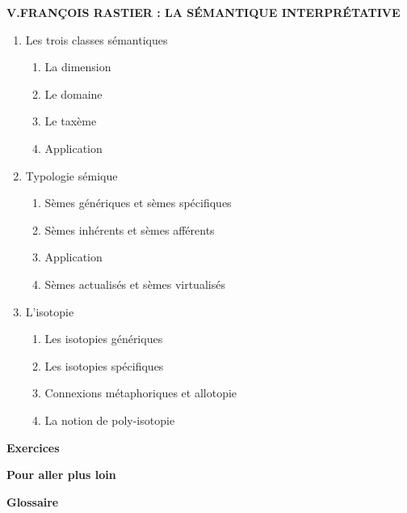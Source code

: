 \begin{keybox}
\begin{enumerate}[label=\arabic*.]
\end{enumerate}
\textbf{V.\quad FRANÇOIS RASTIER : LA SÉMANTIQUE INTERPRÉTATIVE}
\begin{enumerate}[label=\arabic*.]
\item Les trois classes sémantiques
\begin{enumerate}[label=\textcircled{\scriptsize\arabic*}]
\item La dimension
\item Le domaine
\item Le taxème
\item Application
\end{enumerate}
\item Typologie sémique
\begin{enumerate}[label=\textcircled{\scriptsize\arabic*}]
\item Sèmes génériques et sèmes spécifiques
\item Sèmes inhérents et sèmes afférents
\item Application
\item Sèmes actualisés et sèmes virtualisés
\end{enumerate}
\item L’isotopie
\begin{enumerate}[label=\textcircled{\scriptsize\arabic*}]
\item Les isotopies génériques
\item Les isotopies spécifiques
\item Connexions métaphoriques et allotopie
\item La notion de poly-isotopie
\end{enumerate}
\end{enumerate}
\textbf{Exercices}\par\textbf{Pour aller plus loin}\par\textbf{Glossaire}
\end{keybox}

